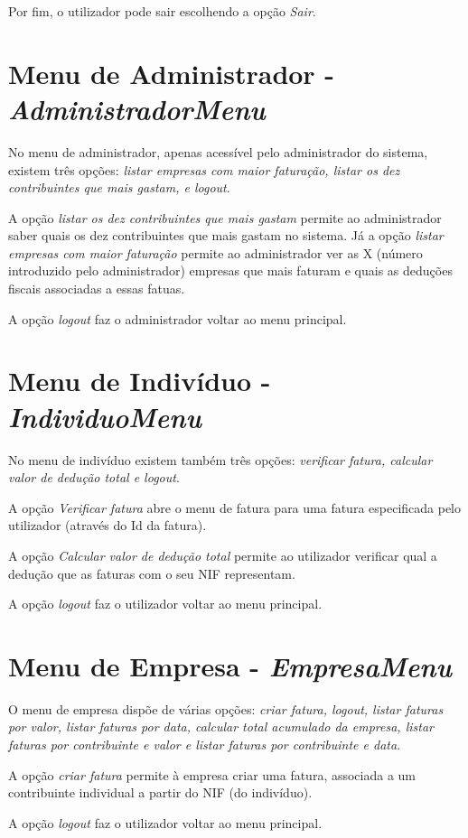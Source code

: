\documentclass[12pt]{report}
\newcommand\tab[1][0.5cm]{\hspace*{#1}}
\begin{document}
Por fim, o utilizador pode sair escolhendo a opção \textit{Sair}.

\section{Menu de Administrador - \textit{AdministradorMenu}}
\tab No menu de administrador, apenas acessível pelo administrador do sistema, existem três opções: \textit{listar empresas com maior faturação, listar os dez contribuintes que mais gastam, e logout}.

A opção \textit{listar os dez contribuintes que mais gastam} permite ao administrador saber quais os dez contribuintes que mais gastam no sistema. Já a opção \textit{listar empresas com maior faturação} permite ao administrador ver as X (número introduzido pelo administrador) empresas que mais faturam e quais as deduções fiscais associadas a essas fatuas.

A opção \textit{logout} faz o administrador voltar ao menu principal.

\section{Menu de Indivíduo - \textit{IndividuoMenu}}
\tab No menu de indivíduo existem também três opções: \textit{verificar fatura, calcular valor de dedução total e logout}.

A opção \textit{Verificar fatura} abre o menu de fatura para uma fatura especificada pelo utilizador (através do Id da fatura).

A opção \textit{Calcular valor de dedução total} permite ao utilizador verificar qual a dedução que as faturas com o seu NIF representam.

A opção \textit{logout} faz o utilizador voltar ao menu principal.

\section{Menu de Empresa - \textit{EmpresaMenu}}
\tab O menu de empresa dispõe de várias opções: \textit{criar fatura, logout, listar faturas por valor, listar faturas por data, calcular total acumulado da empresa, listar faturas por contribuinte e valor e listar faturas por contribuinte e data}.

A opção \textit{criar fatura} permite à empresa criar uma fatura, associada a um contribuinte individual a partir do NIF (do indivíduo).

A opção \textit{logout} faz o utilizador voltar ao menu principal.
\end{document}

